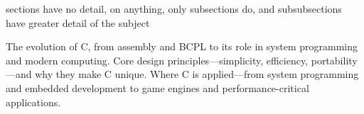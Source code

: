\begin{NxSBox}[][Introduction to C]
	\begin{NxIDBox}
		sections have no detail, on anything, only subsections do, and subsubsections have greater detail of the subject
	\end{NxIDBox}
	\begin{NxIDBoxL}
		 The evolution of C, from assembly and BCPL to its role in system programming and modern computing.
		 Core design principles—simplicity, efficiency, portability—and why they make C unique.
		 Where C is applied—from system programming and embedded development to game engines and performance-critical applications.
	\end{NxIDBoxL}
\end{NxSBox}





